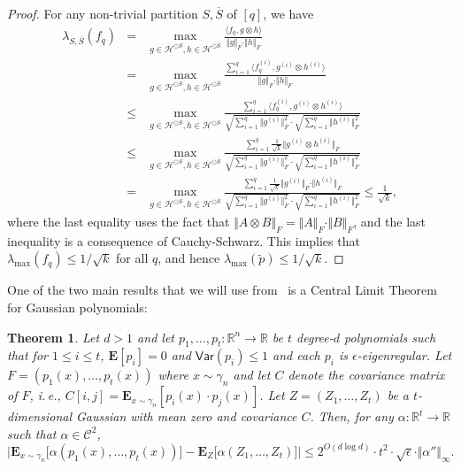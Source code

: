 \documentclass[11pt]{article}
\numberwithin{equation}{section}
\newtheorem{theorem}{Theorem}[section]
\theoremstyle{definition}
\theoremstyle{plain}
\newcommand{\ie}{i.\,e.}
\begin{document}
\begin{proof}
For any non-trivial partition $S, \overline{S}$ of $[q]$, we have
\begin{eqnarray*}
\lambda_{S, \overline{S}}(f_q) &=&  \max_{g \in \mathcal{H}^{\odot S}, h \in \mathcal{H}^{\odot \overline{S}}} \frac{\langle f_q , g \otimes h \rangle}{\Vert g \Vert_F \cdot \Vert h \Vert_F} \\
&=& \max_{g \in \mathcal{H}^{\odot S}, h \in \mathcal{H}^{\odot \overline{S}}} \frac{\sum_{i=1}^q \langle f_q^{(i)}, g^{(i)} \otimes h^{(i)} \rangle }{\Vert g \Vert_F \cdot \Vert h \Vert_F} \\
&\le& \max_{g \in \mathcal{H}^{\odot S}, h \in \mathcal{H}^{\odot \overline{S}}} \frac{\sum_{i=1}^q \langle f_q^{(i)}, g^{(i)} \otimes h^{(i)} \rangle }{ \sqrt{\sum_{i=1}^q \Vert g^{(i)} \Vert_F^2} \cdot  \sqrt{\sum_{i=1}^q \Vert h^{(i)} \Vert_F^2} } \\
 &\le& \max_{g \in \mathcal{H}^{\odot S}, h \in \mathcal{H}^{\odot \overline{S}}} \frac{\sum_{i=1}^q \frac{1}{\sqrt{k}} \Vert g^{(i)} \otimes h^{(i)} \Vert_F }{ \sqrt{\sum_{i=1}^q \Vert g^{(i)} \Vert_F^2} \cdot  \sqrt{\sum_{i=1}^q \Vert h^{(i)} \Vert_F^2} }\\
 &=& \max_{g \in \mathcal{H}^{\odot S}, h \in \mathcal{H}^{\odot \overline{S}}} \frac{\sum_{i=1}^q \frac{1}{\sqrt{k}} \Vert g^{(i)} \Vert_F \cdot \Vert  h^{(i)} \Vert_F }{ \sqrt{\sum_{i=1}^q \Vert g^{(i)} \Vert_F^2} \cdot  \sqrt{\sum_{i=1}^q \Vert h^{(i)} \Vert_F^2} } \le \frac{1}{\sqrt{k}},
\end{eqnarray*}
where the last equality uses the fact that $\Vert A \otimes B \Vert_F = \Vert A
\Vert_F \cdot \Vert B \Vert_F$, and the last inequality is a consequence of
Cauchy-Schwarz. This implies that $\lambda_{\max}(f_q) \le {1}/{\sqrt k}$ for all $q$,
and hence $\lambda_{\max}(\tilde p) \le {1}/{\sqrt k}$.
\end{proof}

One of the two main results that we will use from~\cite{DS14} is a Central Limit Theorem for Gaussian polynomials:

\begin{theorem}\label{thm:CLT}
Let $d >1$ and let $p_1, \ldots, p_t: \mathbb{R}^n \rightarrow \mathbb{R}$ be $t$ degree-$d$ polynomials such that for $1\le i \le t$, $\mathbf{E}[p_i]=0$ and $\mathsf{Var}(p_i) \le 1$ and each $p_i$ is $\epsilon$-eigenregular. Let $F = (p_1(x), \ldots, p_t(x))$ where $x \sim \gamma_n$ and let $C$ denote the covariance matrix of $F$, \ie, $C[i,j] = \mathbf{E}_{x \sim \gamma_n} [p_i(x) \cdot p_j(x)]$.  Let $Z= (Z_1, \ldots, Z_t)$ be a $t$-dimensional Gaussian with mean zero and covariance $C$. 
Then, for any $\alpha:\mathbb{R}^t \rightarrow \mathbb{R}$ such that $\alpha \in \mathcal{C}^2$, 
$$
\big| \mathbf{E}_{x \sim \gamma_n} \big[ \alpha(p_1(x), \ldots, p_t(x)) \big] - \mathbf{E}_{Z} \big[ \alpha(Z_1, \ldots, Z_t) \big] \big|  \le 2^{O( d \log d)} \cdot t^2 \cdot \sqrt{\epsilon} \cdot \Vert \alpha '' \Vert_{\infty}. 
$$
\end{theorem}
\end{document}
